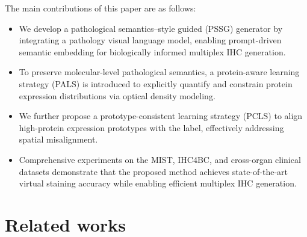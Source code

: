 \documentclass[journal,twoside,web]{ieeecolor}
\newcommand{\revision}[1]{\textcolor{revisioncolor}{#1}}  %
\renewcommand{\revision}[1]{#1}%
\begin{document}



The main contributions of this paper are as follows:
\begin{itemize}
\item[•] \revision{We develop a pathological semantics–style guided (PSSG) generator by integrating a pathology visual language model, enabling prompt-driven semantic embedding for biologically informed multiplex IHC generation.}

\item[•] \revision{To preserve molecular-level pathological semantics, a protein-aware learning strategy (PALS) is introduced to explicitly quantify and constrain protein expression distributions via optical density modeling.}

\item[•] \revision{We further propose a prototype-consistent learning strategy (PCLS) to align high-protein expression prototypes with the label, effectively addressing spatial misalignment.}




\item[•] \revision{Comprehensive experiments on the MIST, IHC4BC, and cross-organ clinical datasets demonstrate that the proposed method achieves state-of-the-art virtual staining accuracy while enabling efficient multiplex IHC generation.}

\end{itemize}




\section{Related works}
\end{document}
